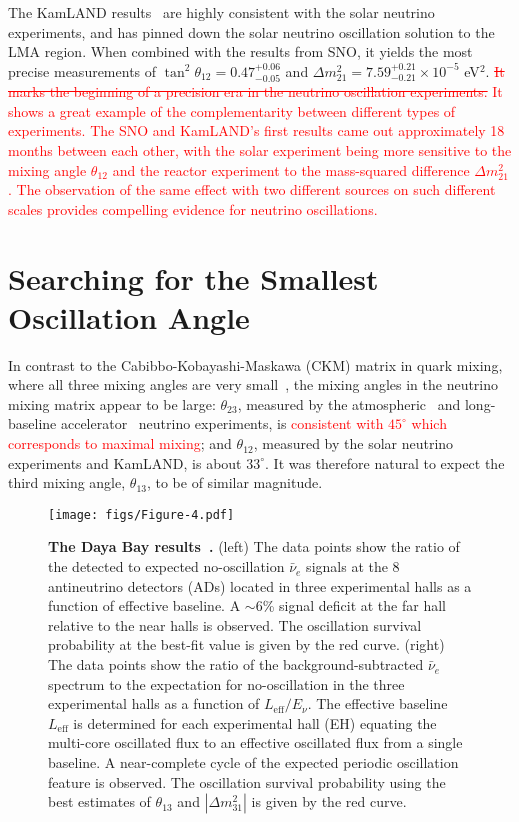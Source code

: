 \documentclass[aps,twocolumn,preprintnumbers,amsmath,superscriptaddress,amssymb,floats,nofootinbib]{revtex4-1}
\begin{document}
The KamLAND results~\cite{Kamland03,Kamland05,Kamland08} are highly consistent with the solar neutrino experiments, and has pinned down the solar neutrino oscillation solution to the LMA region. When combined with the results from SNO, it yields the most precise measurements of $\tan^2\theta_{12} = 0.47^{+0.06}_{-0.05}$ and $\Delta m^2_{21} = 7.59^{+0.21}_{-0.21} \times 10^{-5}$ eV$^2$. \textcolor{red}{\st{It marks the beginning of a precision era in the neutrino oscillation experiments.} It shows a great example of the complementarity between different types of experiments. The SNO and KamLAND's first results came out approximately 18 months between each other, with the solar experiment being more sensitive to the mixing angle $\theta_{12}$ and the reactor experiment to the mass-squared difference $\Delta m^2_{21}$. The observation of the same effect with two different sources on such different scales provides compelling evidence for neutrino oscillations.}


\section{Searching for the Smallest Oscillation Angle} 
\label{sec:theta13}
In contrast to the  Cabibbo-Kobayashi-Maskawa (CKM) matrix in quark mixing, where all three mixing angles are very small~\cite{PDG14}, the mixing angles in the neutrino mixing matrix appear to be large: $\theta_{23}$, measured by the atmospheric~\cite{Kajita} and long-baseline accelerator~\cite{Feldman} neutrino experiments, is \textcolor{red}{consistent with $45^\circ$ which corresponds to maximal mixing}; and $\theta_{12}$, measured by the solar neutrino experiments and KamLAND, is about $33^\circ$. It was therefore natural to expect the third mixing angle, $\theta_{13}$, to be of similar magnitude.

\begin{figure*}[tb] \label{fig:dayabay}
  \centering
  \texttt{[image: figs/Figure-4.pdf]}
  \caption{{\bf The Daya Bay results~\cite{Zhang-Neutrino14}.} (left) The data points show the ratio of the detected to expected no-oscillation $\bar\nu_{e}$ signals at the 8 antineutrino detectors (ADs) located in three experimental halls as a function of effective baseline. A $\sim$6\% signal deficit at the far hall relative to the near halls is observed. The oscillation survival probability at the best-fit value is given by the red curve.
  (right) The data points show the ratio of the background-subtracted $\bar\nu_e$ spectrum to the expectation for no-oscillation in the three experimental halls as a function of $L_{\textrm{eff}}/E_{\nu}$. The effective baseline $L_{\textrm{eff}}$ is determined for each experimental hall (EH) equating the multi-core oscillated flux to an effective oscillated flux from a single baseline. A near-complete cycle of the expected periodic oscillation feature is observed. The oscillation survival probability using the best estimates of $\theta_{13}$ and $|\Delta{m}^2_{31}|$ is given by the red curve.}
\end{figure*}
\end{document}
